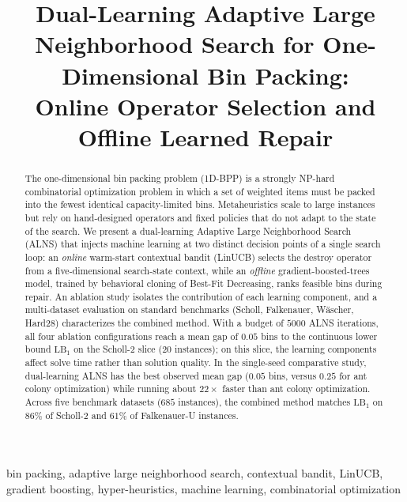\documentclass[conference]{IEEEtran}
\begin{document}
\title{Dual-Learning Adaptive Large Neighborhood Search for One-Dimensional Bin Packing:\\
	Online Operator Selection and Offline Learned Repair}

\author{
}

\maketitle

\begin{abstract}
	The one-dimensional bin packing problem (1D-BPP) is a strongly NP-hard
	combinatorial optimization problem in which a set of weighted items must be
	packed into the fewest identical capacity-limited bins. Metaheuristics scale to
	large instances but rely on hand-designed operators and fixed policies that do
	not adapt to the state of the search. We present a dual-learning Adaptive Large
	Neighborhood Search (ALNS) that injects machine learning at two distinct decision
	points of a single search loop: an \emph{online} warm-start contextual bandit
	(LinUCB) selects the destroy operator from a five-dimensional search-state
	context, while an \emph{offline} gradient-boosted-trees model, trained by
	behavioral cloning of Best-Fit Decreasing, ranks feasible bins during repair. An
	ablation study isolates the contribution of each learning component, and a
	multi-dataset evaluation on standard benchmarks (Scholl, Falkenauer, W\"ascher,
	Hard28) characterizes the combined method. With a budget of $5000$ ALNS
	iterations, all four ablation configurations reach a mean gap of $0.05$ bins to
	the continuous lower bound $\mathrm{LB}_1$ on the Scholl-2 slice ($20$
	instances); on this slice, the learning components affect solve time rather
	than solution quality. In the single-seed comparative study, dual-learning ALNS
	has the best observed mean gap ($0.05$ bins, versus $0.25$ for ant colony
	optimization) while running about $22\times$ faster than ant colony
	optimization. Across five benchmark datasets ($685$ instances), the combined
	method matches $\mathrm{LB}_1$ on $86\%$ of Scholl-2 and $61\%$ of
	Falkenauer-U instances.
\end{abstract}

\begin{IEEEkeywords}
	bin packing, adaptive large neighborhood search, contextual bandit, LinUCB,
	gradient boosting, hyper-heuristics, machine learning, combinatorial optimization
\end{IEEEkeywords}
\end{document}
